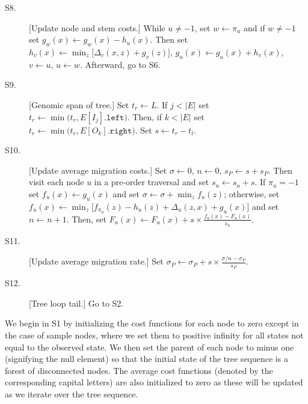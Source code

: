 \begin{description}
\item[S8.] [Update node and stem costs.]
    While $u \neq -1$,
        set $w \leftarrow \pi_u$ and
        if $w \neq -1$
            set $g_w(x) \leftarrow g_w(x) - h_u(x)$.
        Then
        set $h_v(x) \leftarrow \min_{z}\bigl[\Delta_v(x,z) + g_v(z)\bigr]$,
        $g_u(x) \leftarrow g_u(x) + h_v(x)$,
        $v \leftarrow u$, $u \leftarrow w$.
    Afterward, go to S6.

\item[S9.] [Genomic span of tree.]
    Set $t_r \leftarrow L$.
    If $j < |E|$ set
        $t_r \leftarrow \min\bigl(t_r, E[I_j].\texttt{left}\bigr)$.
    Then,
    if $k < |E|$ set
        $t_r \leftarrow \min\bigl(t_r, E[O_k].\texttt{right}\bigr)$.
    Set $s \leftarrow t_r - t_l$.

\item[S10.] [Update average migration costs.]
    Set $\sigma \leftarrow 0$, $n \leftarrow 0$, $s_P \leftarrow s + s_P$.
    Then visit each node $u$ in a pre-order traversal and set
    $s_u \leftarrow s_u + s$.
    If $\pi_u = -1$ set
        $f_u(x) \leftarrow g_u(x)$ and set
        $\sigma \leftarrow \sigma + \min_z f_u(z)$;
    otherwise, set 
        $f_u(x) \leftarrow \min_z \bigl[ f_{\pi_u}(z) - h_u(z) + \Delta_u(z,x) + g_u(x) \bigr]$
        and set $n \leftarrow n + 1$.
    Then, set
        $F_u(x) \leftarrow F_u(x) + s \times \frac{f_u(x) - F_u(x)}{s_u}$.

\item[S11.] [Update average migration rate.]
    Set $\sigma_P \leftarrow \sigma_P + s \times \frac{\sigma/n - \sigma_P}{s_P}$.

\item[S12.] [Tree loop tail.]
    Go to S2.

\end{description}

We begin in S1 by initializing the cost functions for each node to zero except in
the case of sample nodes, where we set them to positive infinity for all states
not equal to the observed state. We then set the parent of each node to minus
one (signifying the null element) so that the initial state of the tree sequence
is a forest of disconnected nodes. The average cost functions (denoted by the
corresponding capital letters) are also initialized to zero as these will be
updated as we iterate over the tree sequence.

